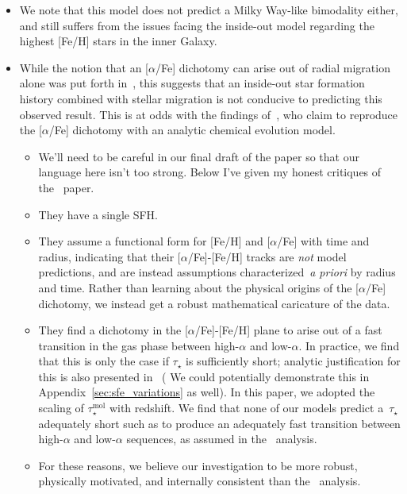 \documentclass[a4paper, fleqn, usenatbib, useAMS]{mnras}
\begin{document}
\begin{itemize}
	\item We note that this model does not predict a Milky Way-like bimodality 
	either, and still suffers from the issues facing the inside-out model 
	regarding the highest [Fe/H] stars in the inner Galaxy. 

	\item While the notion that an [$\alpha$/Fe] dichotomy can arise out of 
	radial migration alone was put forth in~\citet{Schoenrich2009}, this 
	suggests that an inside-out star formation history combined with stellar 
	migration is not conducive to predicting this observed result. This is at 
	odds with the findings of~\citet{Sharma2020}, who claim to reproduce the 
	[$\alpha$/Fe] dichotomy with an analytic chemical evolution model. 
	\begin{itemize} 
		\item {\color{red} We'll need to be careful in our final draft of the 
		paper so that our language here isn't too strong. Below I've given my 
		honest critiques of the~\citet{Sharma2020} paper. } 

		\item They have a single SFH. 

		\item They assume a functional form for [Fe/H] and [$\alpha$/Fe] with 
		time and radius, indicating that their [$\alpha$/Fe]-[Fe/H] tracks are 
		\textit{not} model predictions, and are instead assumptions 
		characterized~\textit{a priori} by radius and time. Rather than 
		learning about the physical origins of the [$\alpha$/Fe] dichotomy, we 
		instead get a robust mathematical caricature of the data. 

		\item They find a dichotomy in the [$\alpha$/Fe]-[Fe/H] plane to arise 
		out of a fast transition in the gas phase between high-$\alpha$ and 
		low-$\alpha$. In practice, we find that this is only the case if 
		$\tau_\star$ is sufficiently short; analytic justification for this is 
		also presented in~\citet{Weinberg2019} ({\color{red} We could 
		potentially demonstrate this in Appendix~\ref{sec:sfe_variations} as 
		well}). In this paper, we adopted the~\citet{Tacconi2018} scaling of 
		$\tau_\star^\text{mol}$ with redshift. We find that none of our models 
		predict a~$\tau_\star$ adequately short such as to produce an 
		adequately fast transition between high-$\alpha$ and low-$\alpha$ 
		sequences, as assumed in the~\citet{Sharma2020} analysis. 

		\item For these reasons, we believe our investigation to be more robust, 
		physically motivated, and internally consistent than 
		the~\citet{Sharma2020} analysis. 
	\end{itemize} 


\end{itemize}
\end{document}
